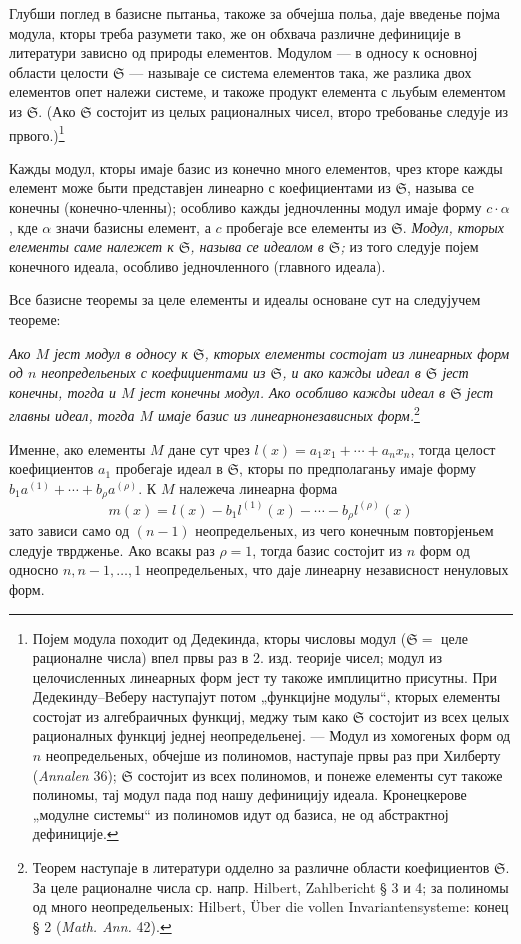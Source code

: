﻿\documentclass[11pt]{article}
\providecommand{\frS}{\mathfrak S}
\begin{document}
Глубши поглед в базисне пытаньа, такоже за обчејша польа, даје введенье појма модула, кторы треба разумети тако, же он обхвача различне дефиниције в литератури зависно од природы елементов. Модулом --- в односу к основној области целости \(\frS\) --- называје се система елементов така, же разлика двох елементов опет належи системе, и такоже продукт елемента с льубым елементом из \(\frS\). (Ако \(\frS\) состојит из целых рационалных чисел, второ требованье следује из првого.)\footnote{Појем модула походит од Дедекинда, кторы числовы модул (\(\frS=\) целе рационалне числа) впел првы раз в 2. изд. теорије чисел; модул из целочисленных линеарных форм јест ту такоже имплицитно присутны. При Дедекинду--Веберу наступајут потом „функцијне модулы“, кторых елементы состојат из алгебраичных функциј, меджу тым како \(\frS\) состојит из всех целых рационалных функциј једнеј неопредельенеј. --- Модул из хомогеных форм од \(n\) неопредельеных, обчејше из полиномов, наступаје првы раз при Хилберту (\emph{Annalen} 36); \(\frS\) состојит из всех полиномов, и понеже елементы сут такоже полиномы, тај модул пада под нашу дефиницију идеала. Кронецкерове „модулне системы“ из полиномов идут од базиса, не од абстрактној дефиниције.}

Кажды модул, кторы имаје базис из конечно много елементов, чрез кторе кажды елемент може быти представјен линеарно с коефициентами из \(\frS\), называ се конечны (конечно-членны); особливо кажды једночленны модул имаје форму \(c\cdot\alpha\), кде \(\alpha\) значи базисны елемент, а \(c\) пробегаје все елементы из \(\frS\). {\itshape Модул, кторых елементы саме належет к \(\frS\), называ се идеалом в \(\frS\);} из того следује појем конечного идеала, особливо једночленного (главного идеала).

Все базисне теоремы за целе елементы и идеалы основане сут на следујучем теореме:

{\itshape Ако \(M\) јест модул в односу к \(\frS\), кторых елементы состојат из линеарных форм од \(n\) неопредельеных с коефициентами из \(\frS\), и ако кажды идеал в \(\frS\) јест конечны, тогда и \(M\) јест конечны модул. Ако особливо кажды идеал в \(\frS\) јест главны идеал, тогда \(M\) имаје базис из линеарнонезависных форм.}\footnote{Теорем наступаје в литератури одделно за различне области коефициентов \(\frS\). За целе рационалне числа ср. напр. Hilbert, Zahlbericht § 3 и 4; за полиномы од много неопредельеных: Hilbert, Über die vollen Invariantensysteme: конец § 2 (\emph{Math. Ann.} 42).}

Именне, ако елементы \(M\) дане сут чрез \(l(x)=a_1x_1+\cdots+a_nx_n\), тогда целост коефициентов \(a_1\) пробегаје идеал в \(\frS\), кторы по предполаганьу имаје форму \(b_1a^{(1)}+\cdots+b_\rho a^{(\rho)}\). К \(M\) належеча линеарна форма
\[
m(x)=l(x)-b_1l^{(1)}(x)-\cdots-b_\rho l^{(\rho)}(x)
\]
зато зависи само од \((n-1)\) неопредельеных, из чего конечным повторјеньем следује тврдженье. Ако всакы раз \(\rho=1\), тогда базис состојит из \(n\) форм од односно \(n,n-1,\ldots,1\) неопредельеных, что даје линеарну независност ненуловых форм.
\end{document}
